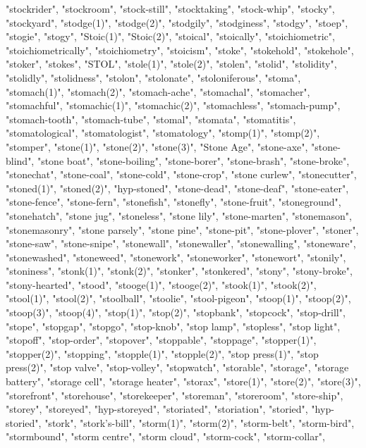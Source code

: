 "stockrider",
"stockroom",
"stock-still",
"stocktaking",
"stock-whip",
"stocky",
"stockyard",
"stodge(1)",
"stodge(2)",
"stodgily",
"stodginess",
"stodgy",
"stoep",
"stogie",
"stogy",
"Stoic(1)",
"Stoic(2)",
"stoical",
"stoically",
"stoichiometric",
"stoichiometrically",
"stoichiometry",
"stoicism",
"stoke",
"stokehold",
"stokehole",
"stoker",
"stokes",
"STOL",
"stole(1)",
"stole(2)",
"stolen",
"stolid",
"stolidity",
"stolidly",
"stolidness",
"stolon",
"stolonate",
"stoloniferous",
"stoma",
"stomach(1)",
"stomach(2)",
"stomach-ache",
"stomachal",
"stomacher",
"stomachful",
"stomachic(1)",
"stomachic(2)",
"stomachless",
"stomach-pump",
"stomach-tooth",
"stomach-tube",
"stomal",
"stomata",
"stomatitis",
"stomatological",
"stomatologist",
"stomatology",
"stomp(1)",
"stomp(2)",
"stomper",
"stone(1)",
"stone(2)",
"stone(3)",
"Stone Age",
"stone-axe",
"stone-blind",
"stone boat",
"stone-boiling",
"stone-borer",
"stone-brash",
"stone-broke",
"stonechat",
"stone-coal",
"stone-cold",
"stone-crop",
"stone curlew",
"stonecutter",
"stoned(1)",
"stoned(2)",
"hyp-stoned",
"stone-dead",
"stone-deaf",
"stone-eater",
"stone-fence",
"stone-fern",
"stonefish",
"stonefly",
"stone-fruit",
"stoneground",
"stonehatch",
"stone jug",
"stoneless",
"stone lily",
"stone-marten",
"stonemason",
"stonemasonry",
"stone parsely",
"stone pine",
"stone-pit",
"stone-plover",
"stoner",
"stone-saw",
"stone-snipe",
"stonewall",
"stonewaller",
"stonewalling",
"stoneware",
"stonewashed",
"stoneweed",
"stonework",
"stoneworker",
"stonewort",
"stonily",
"stoniness",
"stonk(1)",
"stonk(2)",
"stonker",
"stonkered",
"stony",
"stony-broke",
"stony-hearted",
"stood",
"stooge(1)",
"stooge(2)",
"stook(1)",
"stook(2)",
"stool(1)",
"stool(2)",
"stoolball",
"stoolie",
"stool-pigeon",
"stoop(1)",
"stoop(2)",
"stoop(3)",
"stoop(4)",
"stop(1)",
"stop(2)",
"stopbank",
"stopcock",
"stop-drill",
"stope",
"stopgap",
"stopgo",
"stop-knob",
"stop lamp",
"stopless",
"stop light",
"stopoff",
"stop-order",
"stopover",
"stoppable",
"stoppage",
"stopper(1)",
"stopper(2)",
"stopping",
"stopple(1)",
"stopple(2)",
"stop press(1)",
"stop press(2)",
"stop valve",
"stop-volley",
"stopwatch",
"storable",
"storage",
"storage battery",
"storage cell",
"storage heater",
"storax",
"store(1)",
"store(2)",
"store(3)",
"storefront",
"storehouse",
"storekeeper",
"storeman",
"storeroom",
"store-ship",
"storey",
"storeyed",
"hyp-storeyed",
"storiated",
"storiation",
"storied",
"hyp-storied",
"stork",
"stork's-bill",
"storm(1)",
"storm(2)",
"storm-belt",
"storm-bird",
"stormbound",
"storm centre",
"storm cloud",
"storm-cock",
"storm-collar",
